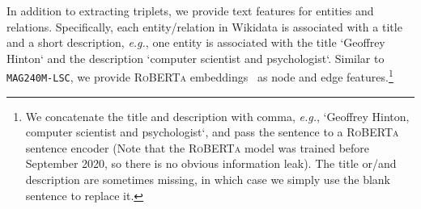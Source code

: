 \documentclass{article}
\newcommand{\ag}{\texttt{MAG240M-LSC}}
\newcommand{\eg}{\textit{e.g.}}
\begin{document}
{\begin{figure}[t]
    \captionsetup{justification=centering}
    \centering
    \label{tab:triplet_wikikg}
    \renewcommand{\arraystretch}{1.1}
\end{figure}

In addition to extracting triplets, we provide text features for entities and relations. Specifically, each entity/relation in Wikidata is associated with a title and a short description, \eg, one entity is associated with the title `Geoffrey Hinton` and the description `computer scientist and psychologist`.
Similar to \ag{}, we provide \textsc{RoBERTa} embeddings~\citep{reimers-2019-sentence-bert,liu2019roberta} as node and edge features.\footnote{We concatenate the title and description with comma, \eg, `Geoffrey Hinton, computer scientist and psychologist`, and pass the sentence to a \textsc{RoBERTa} sentence encoder (Note that the \textsc{RoBERTa} model was trained before September 2020, so there is no obvious information leak). 
The title or/and description are sometimes missing, in which case we simply use the blank sentence to replace it.}

}
\end{document}
